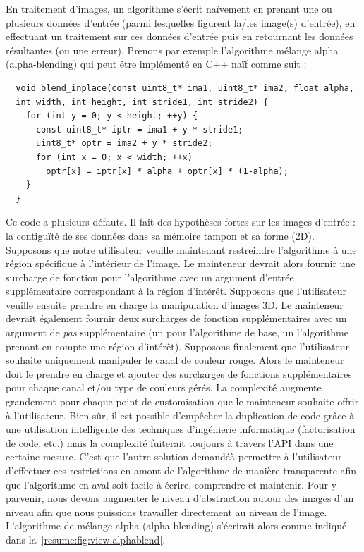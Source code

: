 En traitement d'images, un algorithme s'écrit naïvement en prenant une ou plusieurs données d'entrée (parmi lesquelles
figurent la/les image(s) d'entrée), en effectuant un traitement sur ces données d'entrée puis en retournant les données
résultantes (ou une erreur). Prenons par exemple l'algorithme mélange alpha (alpha-blending) qui peut être implémenté en
C++ naïf comme suit :
\begin{verbatim}
  void blend_inplace(const uint8_t* ima1, uint8_t* ima2, float alpha,
  int width, int height, int stride1, int stride2) {
    for (int y = 0; y < height; ++y) {
      const uint8_t* iptr = ima1 + y * stride1;
      uint8_t* optr = ima2 + y * stride2;
      for (int x = 0; x < width; ++x)
        optr[x] = iptr[x] * alpha + optr[x] * (1-alpha);
    }
  }
\end{verbatim}

Ce code a plusieurs défauts. Il fait des hypothèses fortes sur les images d'entrée : la contiguïté de ses données dans
sa mémoire tampon et sa forme (2D). Supposons que notre utilisateur veuille maintenant restreindre l'algorithme à une
région spécifique à l'intérieur de l'image. Le mainteneur devrait alors fournir une surcharge de fonction pour
l'algorithme avec un argument d'entrée supplémentaire correspondant à la région d'intérêt. Supposons que l'utilisateur
veuille ensuite prendre en charge la manipulation d'images 3D. Le mainteneur devrait également fournir deux surcharges
de fonction supplémentaires avec un argument de \emph{pas} supplémentaire (un pour l'algorithme de base, un l'algorithme
prenant en compte une région d'intérêt). Supposons finalement que l'utilisateur souhaite uniquement manipuler le canal
de couleur rouge. Alors le mainteneur doit le prendre en charge et ajouter des surcharges de fonctions supplémentaires
pour chaque canal et/ou type de couleurs gérés. La complexité augmente grandement pour chaque point de customisation que
le mainteneur souhaite offrir à l'utilisateur. Bien sûr, il est possible d'empêcher la duplication de code grâce à une
utilisation intelligente des techniques d'ingénierie informatique (factorisation de code, etc.) mais la complexité
fuiterait toujours à travers l'API dans une certaine mesure. C'est que l'autre solution demandéà permettre à
l'utilisateur d'effectuer ces restrictions en amont de l'algorithme de manière transparente afin que l'algorithme en
aval soit facile à écrire, comprendre et maintenir. Pour y parvenir, nous devons augmenter le niveau d'abstraction
autour des images d'un niveau afin que nous puissions travailler directement au niveau de l'image. L'algorithme de
mélange alpha (alpha-blending) s'écrirait alors comme indiqué dans la~\cref{resume:fig:view.alphablend}.

